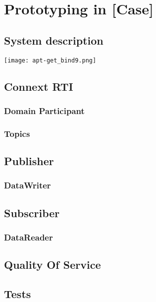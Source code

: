 \chapter{Prototyping in [Case]}

\section{System description}
\begin{center}
	\texttt{[image: apt-get\_bind9.png]}
\end{center}


\section{Connext RTI}

\subsection{Domain Participant}

\subsection{Topics}


\section{Publisher}
\subsection{DataWriter}

\section{Subscriber}
\subsection{DataReader}


\section{Quality Of Service}


\section{Tests}
